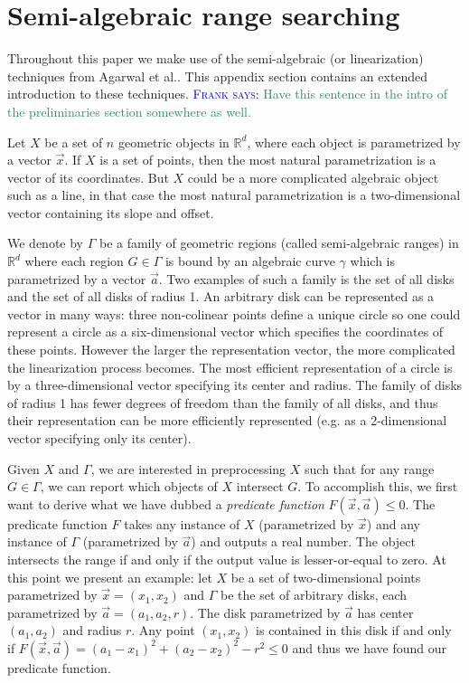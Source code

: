 \documentclass[UKenglish]{lipics-v2019}
\newcommand{\myremark}[4]{\textcolor{blue}{\textsc{#1 #2:}} \textcolor{#4}{\textsf{#3}}}
\newcommand{\frank}[2][says]{\myremark{Frank}{#1}{#2}{SeaGreen}}
\newcommand{\etal}{\textnormal{et al.}\xspace}
\begin{document}

\newpage



\newpage
\appendix

\section{Semi-algebraic range searching}
\label{appx:rangesearch}

Throughout this paper we make use of the semi-algebraic (or linearization) techniques from Agarwal \etal \cite{agarwal2013range}. This appendix section contains an extended introduction to these techniques.
\frank{Have this sentence in
  the intro of the preliminaries section somewhere as well.}

Let $X$ be a set of $n$ geometric objects in $\mathbb{R}^d$, where each object is parametrized by a vector $\vec{x}$. If $X$ is a set of points, then the most natural parametrization is a vector of its coordinates. But $X$ could be a more complicated algebraic object such as a line, in that case the most natural parametrization is a two-dimensional vector containing its slope and offset.

We denote by $\Gamma$ be a family of geometric regions (called semi-algebraic ranges) in $\mathbb{R}^d$ where each region $G \in \Gamma$ is bound by an algebraic curve $\gamma$ which is parametrized by a vector $\vec{a}$. Two examples of such a family is the set of all disks and the set of all disks of radius 1. An arbitrary disk can be represented as a vector in many ways: three non-colinear points define a unique circle so one could represent a circle as a six-dimensional vector which specifies the coordinates of these points. However the larger the representation vector, the more complicated the linearization process becomes. The most efficient representation of a circle is by a three-dimensional vector specifying its center and radius. The family of disks of radius 1 has fewer degrees of freedom than the family of all disks, and thus their representation can be more efficiently represented (e.g. as a 2-dimensional vector specifying only its center).

Given $X$ and $\Gamma$, we are interested in preprocessing $X$ such that for any range $G \in \Gamma$, we can report which objects of $X$ intersect $G$. To accomplish this, we first want to derive what we have dubbed a \emph{predicate function} $F(\vec{x}, \vec{a}) \le 0$. The predicate function $F$ takes any instance of $X$ (parametrized by $\vec{x}$) and any instance of $\Gamma$ (parametrized by $\vec{a}$) and outputs a real number. The object intersects the range if and only if the output value is lesser-or-equal to zero. At this point we present an example: let $X$ be a set of two-dimensional points parametrized by $\vec{x} = (x_1, x_2)$ and $\Gamma$ be the set of arbitrary disks, each parametrized by $\vec{a} = (a_1, a_2, r)$. The disk parametrized by $\vec{a}$ has center $(a_1, a_2)$ and radius $r$. Any point $(x_1, x_2)$ is contained in this disk if and only if $F(\vec{x}, \vec{a}) = (a_1 - x_1)^2 + (a_2 - x_2)^2 - r^2 \le 0$ and thus we have found our predicate function.
\end{document}
